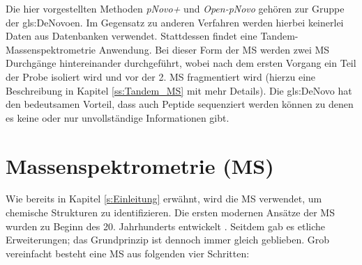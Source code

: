 \documentclass[a4paper, 12pt]{article}
\newcommand{\gerquot}[1]{\glqq#1\grqq}
\begin{document}
Die hier vorgestellten Methoden \emph{pNovo+} und \emph{Open-pNovo} gehören zur Gruppe der \gls{gls:DeNovo}en. Im Gegensatz zu anderen Verfahren werden hierbei keinerlei Daten aus Datenbanken verwendet. Stattdessen findet eine Tandem-Massenspektrometrie Anwendung. Bei dieser Form der MS werden zwei MS Durchgänge hintereinander durchgeführt, wobei nach dem ersten Vorgang ein Teil der Probe isoliert wird und vor der 2. MS \gerquot{fragmentiert} wird (hierzu eine Beschreibung in Kapitel \ref{ss:Tandem_MS} mit mehr Details). Die \gls{gls:DeNovo} hat den bedeutsamen Vorteil, dass auch Peptide sequenziert werden können zu denen es keine oder nur unvollständige Informationen gibt.






\section{Massenspektrometrie (MS)}\label{s:MS}
Wie bereits in Kapitel \ref{s:Einleitung} erwähnt, wird die MS verwendet, um chemische Strukturen zu identifizieren. Die ersten modernen Ansätze der MS wurden zu Beginn des 20. Jahrhunderts entwickelt \cite[5678]{griffiths2008brief}. Seitdem gab es etliche Erweiterungen; das Grundprinzip ist dennoch immer gleich geblieben. Grob vereinfacht besteht eine MS aus folgenden vier Schritten:
\end{document}
